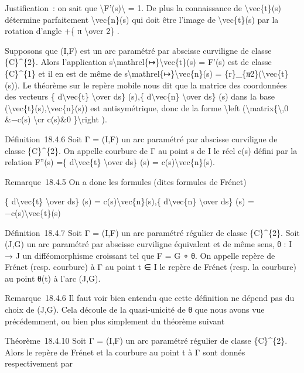 \documentclass[]{article}
\begin{document}
Justification~: on sait que
\textbackslash{}\textbar{}F'(s)\textbackslash{}\textbar{} = 1. De plus
la connaissance de \textbackslash{}vec\{t\}(s) détermine parfaitement
\textbackslash{}vec\{n\}(s) qui doit être l'image de
\textbackslash{}vec\{t\}(s) par la rotation d'angle +\{ π
\textbackslash{}over 2\} .

Supposons que (I,F) est un arc paramétré par abscisse curviligne de
classe \{C\}\^{}\{2\}. Alors l'application
s\textbackslash{}mathrel\{↦\}\textbackslash{}vec\{t\}(s) = F'(s) est de
classe \{C\}\^{}\{1\} et il en est de même de
s\textbackslash{}mathrel\{↦\}\textbackslash{}vec\{n\}(s) =
\{r\}\_\{π∕2\}(\textbackslash{}vec\{t\}(s)). Le théorème sur le repère
mobile nous dit que la matrice des coordonnées des vecteurs \{
d\textbackslash{}vec\{t\} \textbackslash{}over ds\} (s),\{
d\textbackslash{}vec\{n\} \textbackslash{}over ds\} (s) dans la base
(\textbackslash{}vec\{t\}(s),\textbackslash{}vec\{n\}(s)) est
antisymétrique, donc de la forme \textbackslash{}left
(\textbackslash{}matrix\{\textbackslash{},0 \&−c(s) \textbackslash{}cr
c(s)\&0 \}\textbackslash{}right ).

Définition~18.4.6 Soit Γ = (I,F) un arc paramétré par abscisse
curviligne de classe \{C\}\^{}\{2\}. On appelle courbure de Γ au point s
de I le réel c(s) défini par la relation F''(s) =\{
d\textbackslash{}vec\{t\} \textbackslash{}over ds\} (s) =
c(s)\textbackslash{}vec\{n\}(s).

Remarque~18.4.5 On a donc les formules (dites formules de Frénet)

\{ d\textbackslash{}vec\{t\} \textbackslash{}over ds\} (s) =
c(s)\textbackslash{}vec\{n\}(s),\{ d\textbackslash{}vec\{n\}
\textbackslash{}over ds\} (s) = −c(s)\textbackslash{}vec\{t\}(s)

Définition~18.4.7 Soit Γ = (I,F) un arc paramétré régulier de classe
\{C\}\^{}\{2\}. Soit (J,G) un arc paramétré par abscisse curviligne
équivalent et de même sens, θ : I → J un difféomorphisme croissant tel
que F = G ∘ θ. On appelle repère de Frénet (resp. courbure) à Γ au point
t ∈ I le repère de Frénet (resp. la courbure) au point θ(t) à l'arc
(J,G).

Remarque~18.4.6 Il faut voir bien entendu que cette définition ne dépend
pas du choix de (J,G). Cela découle de la quasi-unicité de θ que nous
avons vue précédemment, ou bien plus simplement du théorème suivant

Théorème~18.4.10 Soit Γ = (I,F) un arc paramétré régulier de classe
\{C\}\^{}\{2\}. Alors le repère de Frénet et la courbure au point t à Γ
sont donnés respectivement par
\end{document}
